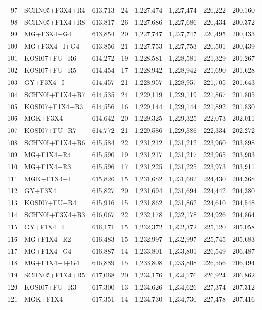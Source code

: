 \begin{table}
\begin{longtable}{rlrrrrrr}
97&SCHN05+F3X4+R4&613,713&24&1,227,474&1,227,474&220,222&200,160\\
98&SCHN05+F1X4+R8&613,817&26&1,227,686&1,227,686&220,434&200,372\\
99&MG+F3X4+G4&613,854&20&1,227,747&1,227,747&220,495&200,433\\
100&MG+F3X4+I+G4&613,856&21&1,227,753&1,227,753&220,501&200,439\\
101&KOSI07+FU+R6&614,272&19&1,228,581&1,228,581&221,329&201,267\\
102&KOSI07+FU+R5&614,454&17&1,228,942&1,228,942&221,690&201,628\\
103&GY+F3X4+I&614,457&21&1,228,957&1,228,957&221,705&201,643\\
104&SCHN05+F1X4+R7&614,535&24&1,229,119&1,229,119&221,867&201,805\\
105&KOSI07+F1X4+R3&614,556&16&1,229,144&1,229,144&221,892&201,830\\
106&MGK+F3X4&614,642&20&1,229,325&1,229,325&222,073&202,011\\
107&KOSI07+FU+R7&614,772&21&1,229,586&1,229,586&222,334&202,272\\
108&SCHN05+F1X4+R6&615,584&22&1,231,212&1,231,212&223,960&203,898\\
109&MG+F1X4+R4&615,590&19&1,231,217&1,231,217&223,965&203,903\\
110&MG+F1X4+R3&615,596&17&1,231,225&1,231,225&223,973&203,911\\
111&MGK+F1X4+I&615,826&15&1,231,682&1,231,682&224,430&204,368\\
112&GY+F3X4&615,827&20&1,231,694&1,231,694&224,442&204,380\\
113&KOSI07+FU+R4&615,916&15&1,231,862&1,231,862&224,610&204,548\\
114&SCHN05+F3X4+R3&616,067&22&1,232,178&1,232,178&224,926&204,864\\
115&GY+F1X4+I&616,171&15&1,232,372&1,232,372&225,120&205,058\\
116&MG+F1X4+R2&616,483&15&1,232,997&1,232,997&225,745&205,683\\
117&MG+F1X4+G4&616,887&14&1,233,801&1,233,801&226,549&206,487\\
118&MG+F1X4+I+G4&616,889&15&1,233,808&1,233,808&226,556&206,494\\
119&SCHN05+F1X4+R5&617,068&20&1,234,176&1,234,176&226,924&206,862\\
120&KOSI07+FU+R3&617,300&13&1,234,626&1,234,626&227,374&207,312\\
121&MGK+F1X4&617,351&14&1,234,730&1,234,730&227,478&207,416\\

\end{longtable}
\end{table}
